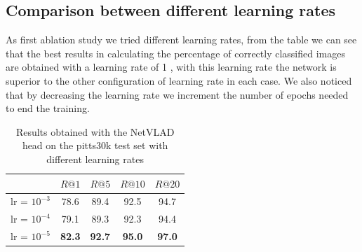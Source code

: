 \documentclass[10pt,twocolumn,letterpaper]{article}
\begin{document}
\subsection{Comparison between different learning rates}
As first ablation study we tried different learning rates, from the table we can see that the best results in calculating the percentage of correctly classified images are obtained with a learning rate of 1 , with this learning rate the network is superior to the other configuration of learning rate in each case. We also noticed that by decreasing the learning rate we increment the number of epochs needed to end the training.
\begin{table}[!h]
	\centering
	\begin{tabular}{|l|c|c|c|c|}
		\hline
		&          $R@1$  &        $R@5$  &        $R@10$ &        $R@20$   \\ \hline     
		lr = $10^{-3}$ &         78.6    &    89.4       &    92.5       &         94.7       \\
		lr = $10^{-4}$ &         79.1    &         89.3  & 92.3 & 94.4  \\    
		lr = $10^{-5}$ & \textbf{82.3}   & \textbf{92.7} &         \textbf{95.0}  & \textbf{97.0}          \\
		\hline
	\end{tabular}
	\caption{Results obtained with the NetVLAD head on the pitts30k test set with different learning rates}
	\label{tab:NETVLAD:lr}
\end{table}
\end{document}
